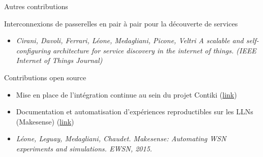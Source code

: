 \begin{frame}{Autres contributions}
  
  \begin{block}{Interconnexions de passerelles en pair à pair pour la découverte de services}
    \begin{itemize}
      \item \textit{{Cirani, Davoli, Ferrari, L{\'e}one, Medagliani, Picone, Veltri} A scalable and self-configuring architecture for service discovery in
        the internet of things. (IEEE Internet of Things Journal)}

    \end{itemize}
  \end{block}

  \begin{block}{Contributions open source}
    \begin{itemize}
      \item Mise en place de l'intégration continue au sein du projet Contiki (\href{https://contiki-os.blogspot.fr/2012/12/contiki-regression-tests-9-hardware.html}{link})
      \item Documentation et automatisation d'expériences reproductibles sur les LLNs (Makesense) (\href{https://github.com/sieben/makesense}{link})
      \item \textit{L{\'e}one, Leguay, Medagliani, Chaudet. Makesense: Automating WSN experiments and simulations.
              EWSN, 2015.}
    \end{itemize}
  \end{block}




\end{frame}


